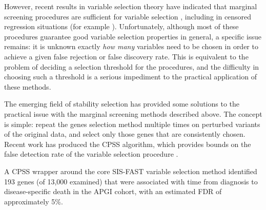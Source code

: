 \documentclass[dissertation.tex]{subfiles}
\begin{document}
However, recent results in variable selection theory have indicated that marginal screening procedures are sufficient for variable selection \cite{Fan2008}, including in censored regression situations (for example \cite{Gorst-Rasmussen2013}).  Unfortunately, although most of these procedures guarantee good variable selection properties in general, a specific issue remains: it is unknown exactly \emph{how many} variables need to be chosen in order to achieve a given false rejection or false discovery rate.  This is equivalent to the problem of deciding a selection threshold for the procedures, and the difficulty in choosing such a threshold is a serious impediment to the practical application of these methods.

The emerging field of stability selection has provided some solutions to the practical issue with the marginal screening methods described above.  The concept is simple: repeat the genes selection method multiple times on perturbed variants of the original data, and select only those genes that are consistently chosen.  Recent work has produced the \gls{CPSS} algorithm, which provides bounds on the false detection rate of the variable selection procedure \cite{Shah2013}.

A \gls{CPSS} wrapper around the core \gls{SIS}-\gls{FAST} variable selection method\cite{Gorst-Rasmussen2013} identified 193 genes (of 13,000 examined) that were associated with time from diagnosis to disease-specific death in the \gls{APGI} cohort, with an estimated \gls{FDR} of approximately 5\%.
\end{document}
